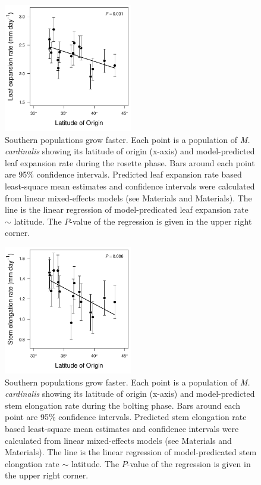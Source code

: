 \documentclass[11pt, oneside]{article}
\begin{document}
\begin{figure}[h!]
	\centerline{\includegraphics[width=0.5\textwidth]{Figures/FigureS_LERlat.pdf}}
	\fontsize{10}{12}
	\selectfont
	\caption[Southern populations grow faster (leaf expansion rate).]{Southern populations grow faster. Each point is a population of \textit{M. cardinalis} showing its latitude of origin (x-axis) and model-predicted leaf expansion rate during the rosette phase. Bars around each point are 95\% confidence intervals. Predicted leaf expansion rate based least-square mean estimates and confidence intervals were calculated from linear mixed-effects models (see Materials and Materials). The line is the linear regression of model-predicated leaf expansion rate $\sim$ latitude. The $P$-value of the regression is given in the upper right corner.}
	\label{fig:FigS_LERlat}
\end{figure}


\begin{figure}[h!]
	\centerline{\includegraphics[width=0.5\textwidth]{Figures/FigureS_SERlat.pdf}}
	\fontsize{10}{12}
	\selectfont
	\caption[Southern populations grow faster (stem elongation rate).]{Southern populations grow faster. Each point is a population of \textit{M. cardinalis} showing its latitude of origin (x-axis) and model-predicted stem elongation rate during the bolting phase. Bars around each point are 95\% confidence intervals. Predicted stem elongation rate based least-square mean estimates and confidence intervals were calculated from linear mixed-effects models (see Materials and Materials). The line is the linear regression of model-predicated stem elongation rate $\sim$ latitude. The $P$-value of the regression is given in the upper right corner.}
	\label{fig:FigS_SERlat}
\end{figure}
\end{document}
